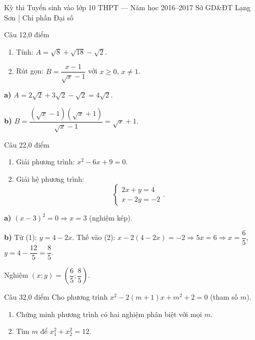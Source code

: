 ﻿%
%
  {Kỳ thi Tuyển sinh vào lớp 10 THPT — Năm học 2016--2017}%
  {Sở GD\&ĐT Lạng Sơn | Chỉ phần Đại số}

\begin{de_cau}{Câu 1}{2,0 điểm}
\begin{enumerate}[label=\alph*)]
  \item Tính: $A = \sqrt{8}+\sqrt{18}-\sqrt{2}$.
  \item Rút gọn: $B = \dfrac{x-1}{\sqrt{x}-1}$ với $x\ge0$, $x\neq1$.
\end{enumerate}
\end{de_cau}

\begin{loi_giai_cau}
\textbf{a)} $A=2\sqrt{2}+3\sqrt{2}-\sqrt{2}=\boxed{4\sqrt{2}}$.

\textbf{b)} $B=\dfrac{(\sqrt{x}-1)(\sqrt{x}+1)}{\sqrt{x}-1}=\boxed{\sqrt{x}+1}$.
\end{loi_giai_cau}

\begin{de_cau}{Câu 2}{2,0 điểm}
\begin{enumerate}[label=\alph*)]
  \item Giải phương trình: $x^2-6x+9=0$.
  \item Giải hệ phương trình:
  \[\begin{cases} 2x+y=4 \\ x-2y=-2 \end{cases}.\]
\end{enumerate}
\end{de_cau}

\begin{loi_giai_cau}
\textbf{a)} $(x-3)^2=0\Rightarrow\boxed{x=3}$ (nghiệm kép).

\textbf{b)} Từ (1): $y=4-2x$. Thế vào (2): $x-2(4-2x)=-2\Rightarrow5x=6\Rightarrow x=\dfrac{6}{5}$, $y=4-\dfrac{12}{5}=\dfrac{8}{5}$.

Nghiệm $\boxed{(x;y)=\left(\dfrac{6}{5};\dfrac{8}{5}\right)}$.
\end{loi_giai_cau}

\begin{de_cau}{Câu 3}{2,0 điểm}
Cho phương trình $x^2-2(m+1)x+m^2+2=0$ (tham số $m$).
\begin{enumerate}[label=\alph*)]
  \item Chứng minh phương trình có hai nghiệm phân biệt với mọi $m$.
  \item Tìm $m$ để $x_1^2+x_2^2=12$.
\end{enumerate}
\end{de_cau}

